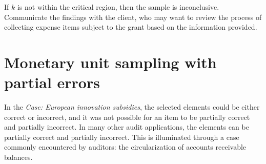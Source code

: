 If $k$ is not within the critical region, then the sample is inconclusive. Communicate the findings with the client, who may want to review the process of collecting expense items subject to the grant based on the information provided.


\section{Monetary unit sampling with partial errors} %
\label{sec:partial_errors}

In the \emph{Case: European innovation subsidies}, the selected elements could be either correct or incorrect, and it was not possible for an item to be partially correct and partially incorrect.  In many other audit applications, the elements can be partially correct and partially incorrect. This is illuminated through a case commonly encountered by auditors: the circularization of accounts receivable balances.

